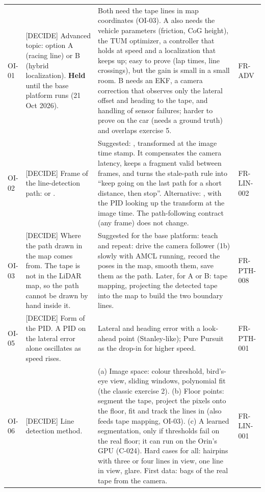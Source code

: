 \documentclass[11pt,a4paper]{article}
\begin{document}
\begin{small}
\begin{tabularx}{\textwidth}{@{}L{1.1cm} L{3.4cm} Y L{1.9cm}@{}}
\toprule
{} &  &  &  \\
\midrule
\endhead
OI-01 & [DECIDE] Advanced topic: option A (racing line) or B (hybrid localization). \textbf{Held} until the base platform runs (21 Oct 2026). & Both need the tape lines in map coordinates (OI-03). A also needs the vehicle parameters (friction, CoG height), the TUM optimizer, a controller that holds at speed and a localization that keeps up; easy to prove (lap times, line crossings), but the gain is small in a small room. B needs an EKF, a camera correction that observes only the lateral offset and heading to the tape, and handling of sensor failures; harder to prove on the car (needs a ground truth) and overlaps exercise 5. & FR-ADV \\
OI-02 & [DECIDE] Frame of the line-detection path:  or . & Suggested: , transformed at the image time stamp. It compensates the camera latency, keeps a fragment valid between frames, and turns the stale-path rule into ``keep going on the last path for a short distance, then stop''. Alternative: , with the PID looking up the transform at the image time. The path-following contract (any frame) does not change. & FR-LIN-002 \\
OI-03 & [DECIDE] Where the path drawn in the map comes from. The tape is not in the LiDAR map, so the path cannot be drawn by hand inside it. & Suggested for the base platform: teach and repeat: drive the camera follower (1b) slowly with AMCL running, record the poses in the map, smooth them, save them as the path. Later, for A or B: tape mapping, projecting the detected tape into the map to build the two boundary lines. & FR-PTH-008 \\
OI-05 & [DECIDE] Form of the PID. A PID on the lateral error alone oscillates as speed rises. & Lateral and heading error with a look-ahead point (Stanley-like); Pure Pursuit as the drop-in for higher speed. & FR-PTH-001 \\
OI-06 & [DECIDE] Line detection method. & (a) Image space: colour threshold, bird's-eye view, sliding windows, polynomial fit (the classic exercise 2). (b) Floor points: segment the tape, project the pixels onto the floor, fit and track the lines in  (also feeds tape mapping, OI-03). (c) A learned segmentation, only if thresholds fail on the real floor; it can run on the Orin's GPU (C-024). Hard cases for all: hairpins with three or four lines in view, one line in view, glare. First data: bags of the real tape from the camera. & FR-LIN-001 \\

\end{tabularx}
\end{small}
\end{document}
